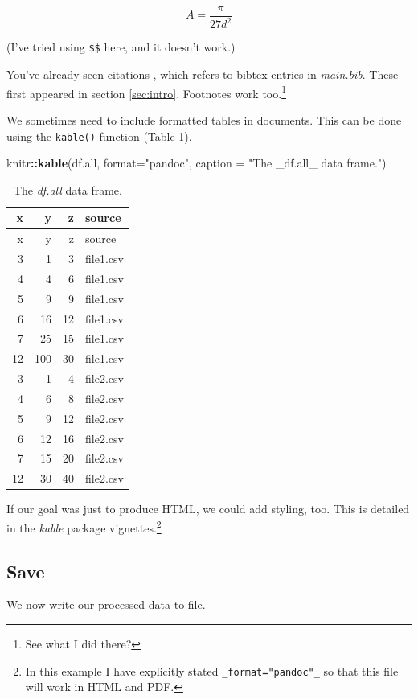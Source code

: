 \documentclass[11pt,]{article}
\newenvironment{Shaded}{\begin{snugshade}}{\end{snugshade}}
\newcommand{\DataTypeTok}[1]{\textcolor[rgb]{0.13,0.29,0.53}{#1}}
\newcommand{\KeywordTok}[1]{\textcolor[rgb]{0.13,0.29,0.53}{\textbf{#1}}}
\newcommand{\NormalTok}[1]{#1}
\newcommand{\OperatorTok}[1]{\textcolor[rgb]{0.81,0.36,0.00}{\textbf{#1}}}
\newcommand{\StringTok}[1]{\textcolor[rgb]{0.31,0.60,0.02}{#1}}
\let\rmarkdownfootnote\footnote%
\def\footnote{\protect\rmarkdownfootnote}
\begin{document}
\begin{equation}
A=\frac{\pi}{27d^2}
\label{eq:eq}
\end{equation}

(I've tried using \texttt{\$\$} here, and it doesn't work.)

You've already seen citations \citep{R-base}, which refers to bibtex entries in \href{main.bib}{\emph{main.bib}}. These first appeared in section \ref{sec:intro}. Footnotes work too.\footnote{See what I did there?}

We sometimes need to include formatted tables in documents. This can be done using the \texttt{kable()} function (Table \ref{tab:dfall}).

\begin{Shaded}
\begin{Highlighting}[]
\NormalTok{knitr}\OperatorTok{::}\KeywordTok{kable}\NormalTok{(df.all,}
  \DataTypeTok{format=}\StringTok{"pandoc"}\NormalTok{,}
  \DataTypeTok{caption =} \StringTok{"The _df.all_ data frame."}\NormalTok{)}
\end{Highlighting}
\end{Shaded}

\begin{longtable}[]{@{}rrrl@{}}
\caption{\label{tab:dfall}The \emph{df.all} data frame.}\tabularnewline
\toprule
x & y & z & source\tabularnewline
\midrule
\endfirsthead
\toprule
x & y & z & source\tabularnewline
\midrule
\endhead
3 & 1 & 3 & file1.csv\tabularnewline
4 & 4 & 6 & file1.csv\tabularnewline
5 & 9 & 9 & file1.csv\tabularnewline
6 & 16 & 12 & file1.csv\tabularnewline
7 & 25 & 15 & file1.csv\tabularnewline
12 & 100 & 30 & file1.csv\tabularnewline
3 & 1 & 4 & file2.csv\tabularnewline
4 & 6 & 8 & file2.csv\tabularnewline
5 & 9 & 12 & file2.csv\tabularnewline
6 & 12 & 16 & file2.csv\tabularnewline
7 & 15 & 20 & file2.csv\tabularnewline
12 & 30 & 40 & file2.csv\tabularnewline
\bottomrule
\end{longtable}

If our goal was just to produce HTML, we could add styling, too. This is detailed in the \emph{kable} package vignettes.\footnote{In this example I have explicitly stated \texttt{\_format="pandoc"\_} so that this file will work in HTML and PDF.}

\hypertarget{implementSave}{%
\subsection{Save}\label{implementSave}}

We now write our processed data to file.
\end{document}
